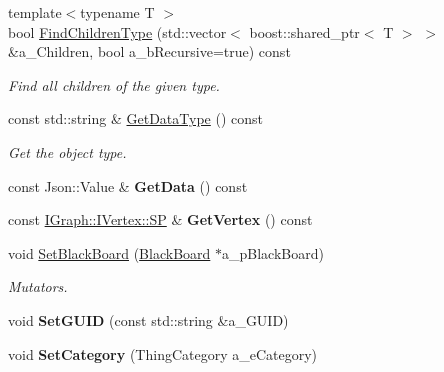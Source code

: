 \begin{DoxyCompactItemize}
{\footnotesize template$<$typename T $>$ }\\bool \hyperlink{class_i_thing_a2c52ee1221dd4c9248c45abfdee7730f}{Find\+Children\+Type} (std\+::vector$<$ boost\+::shared\+\_\+ptr$<$ T $>$ $>$ \&a\+\_\+\+Children, bool a\+\_\+b\+Recursive=true) const
\begin{DoxyCompactList}\small\item\em Find all children of the given type. \end{DoxyCompactList}\item 
\mbox{\label{class_i_thing_a5bb95c087dafd0af3c111d1684d37575}} 
const std\+::string \& \hyperlink{class_i_thing_a5bb95c087dafd0af3c111d1684d37575}{Get\+Data\+Type} () const
\begin{DoxyCompactList}\small\item\em Get the object type. \end{DoxyCompactList}\item 
\mbox{\label{class_i_thing_a450fd65be6ba340814c491a9fcbd54d6}} 
const Json\+::\+Value \& {\bfseries Get\+Data} () const
\item 
\mbox{\label{class_i_thing_a52adc46244acab54dede4068e702bdd6}} 
const \hyperlink{class_i_graph_1_1_i_vertex_af72b9df91f110bc7824c608c10cc819c}{I\+Graph\+::\+I\+Vertex\+::\+SP} \& {\bfseries Get\+Vertex} () const
\item 
\mbox{\label{class_i_thing_a3263b2b12d47be209251c2d05e0b8bc5}} 
void \hyperlink{class_i_thing_a3263b2b12d47be209251c2d05e0b8bc5}{Set\+Black\+Board} (\hyperlink{class_black_board}{Black\+Board} $\ast$a\+\_\+p\+Black\+Board)
\begin{DoxyCompactList}\small\item\em Mutators. \end{DoxyCompactList}\item 
\mbox{\label{class_i_thing_a74066783f759d31a6223c0933f8dfd24}} 
void {\bfseries Set\+G\+U\+ID} (const std\+::string \&a\+\_\+\+G\+U\+ID)
\item 
\mbox{\label{class_i_thing_a10b45e2a3bbc7514898f46a8e6d475be}} 
void {\bfseries Set\+Category} (Thing\+Category a\+\_\+e\+Category)
\item 
\mbox{\label{class_i_thing_ac4e94c91c613375ef8ebc75eaa8efcf9}} 

\end{DoxyCompactItemize}
